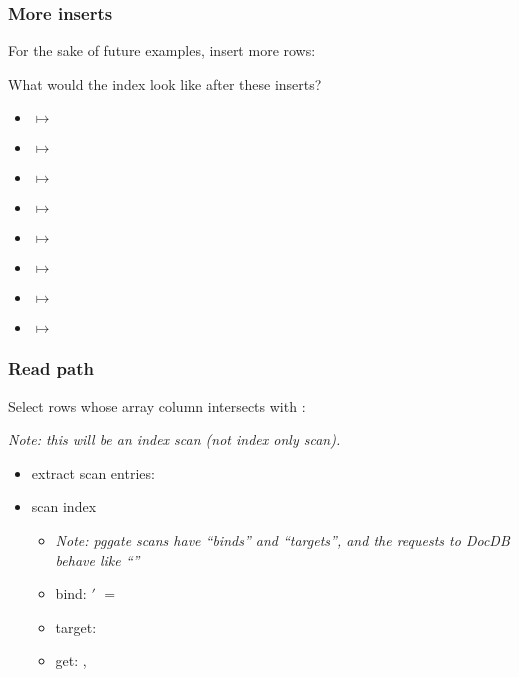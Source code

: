 \begin{frame}
  \frametitle{More inserts}
  For the sake of future examples, insert more rows:



  \pause

  What would the index look like after these inserts?
  \pause

  \begin{itemize}
    \item {} $\mapsto$ 
    \item {} $\mapsto$ 
    \item {} $\mapsto$ 
    \item {} $\mapsto$ 
    \item {} $\mapsto$ 
    \item {} $\mapsto$ 
    \item {} $\mapsto$ 
    \item {} $\mapsto$ 
  \end{itemize}
\end{frame}

\begin{frame}
  \frametitle{Read path}
  Select rows whose array column intersects with :

  \pause

  \emph{Note: this will be an index scan (not index only scan).}
  \pause

  \begin{itemize}
    \item extract scan entries: 
      \pause
    \item scan index
      \begin{itemize}
        \item \emph{Note: pggate scans have ``binds'' and ``targets'', and the
          requests to DocDB behave like ``''}
          \pause
        \item bind: $'$ $=$ 
          \pause
        \item target: 
          \pause
        \item get: , 
      \end{itemize}
  \end{itemize}
\end{frame}

